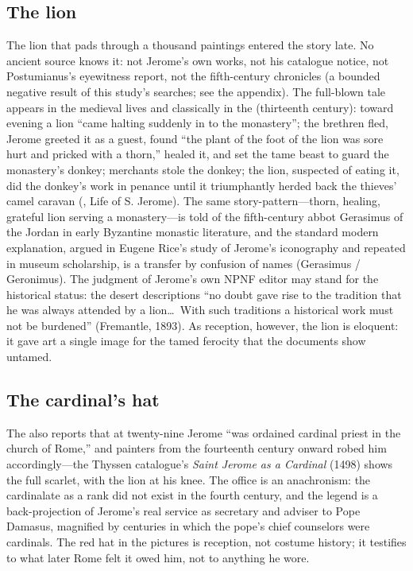 \subsection{The lion}

The lion that pads through a thousand paintings entered the story late. No
ancient source knows it: not Jerome's own works, not his catalogue notice,
not Postumianus's eyewitness report, not the fifth-century chronicles (a
bounded negative result of this study's searches; see the appendix). The
full-blown tale appears in the medieval lives and classically in the
 (thirteenth century): toward evening a lion ``came
halting suddenly in to the monastery''; the brethren fled, Jerome greeted it
as a guest, found ``the plant of the foot of the lion was sore hurt and
pricked with a thorn,'' healed it, and set the tame beast to guard the
monastery's donkey; merchants stole the donkey; the lion, suspected of
eating it, did the donkey's work in penance until it triumphantly herded
back the thieves' camel caravan (, Life of S. Jerome).
The same story-pattern---thorn, healing, grateful lion serving a
monastery---is told of the fifth-century abbot Gerasimus of the Jordan in
early Byzantine monastic literature, and the standard modern explanation,
argued in Eugene Rice's study of Jerome's iconography and repeated in
museum scholarship, is a transfer by confusion of names (Gerasimus /
Geronimus). The judgment of Jerome's own NPNF editor may stand for the
historical status: the desert descriptions ``no doubt gave rise to the
tradition that he was always attended by a lion\ldots\ With such traditions
a historical work must not be burdened'' (Fremantle, 1893). As reception,
however, the lion is eloquent: it gave art a single image for the tamed
ferocity that the documents show untamed.

\subsection{The cardinal's hat}

The  also reports that at twenty-nine Jerome ``was
ordained cardinal priest in the church of Rome,'' and painters from the
fourteenth century onward robed him accordingly---the Thyssen catalogue's
\textit{Saint Jerome as a Cardinal} (1498) shows the full scarlet, with the
lion at his knee. The office is an anachronism: the cardinalate as a rank
did not exist in the fourth century, and the legend is a back-projection of
Jerome's real service as secretary and adviser to Pope Damasus, magnified
by centuries in which the pope's chief counselors were cardinals. The
red hat in the pictures is reception, not costume history; it testifies to
what later Rome felt it owed him, not to anything he wore.

